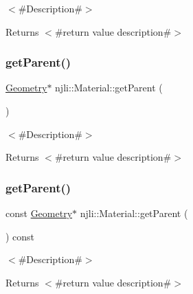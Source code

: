 $<$\#\+Description\#$>$

\begin{DoxyReturn}{Returns}
$<$\#return value description\#$>$ 
\end{DoxyReturn}
\mbox{\label{classnjli_1_1_material_a45ed0723a5bff8db95b0e6e5b6b48a3e}} 
\subsubsection{\texorpdfstring{get\+Parent()}{getParent()}\hspace{0.1cm}{\footnotesize\ttfamily [1/2]}}
{\footnotesize\ttfamily \mbox{\hyperlink{classnjli_1_1_geometry}{Geometry}}$\ast$ njli\+::\+Material\+::get\+Parent (\begin{DoxyParamCaption}{ }\end{DoxyParamCaption})}

$<$\#\+Description\#$>$

\begin{DoxyReturn}{Returns}
$<$\#return value description\#$>$ 
\end{DoxyReturn}
\mbox{\label{classnjli_1_1_material_a77b6c840f54e6a088248a46f43ac7f23}} 
\subsubsection{\texorpdfstring{get\+Parent()}{getParent()}\hspace{0.1cm}{\footnotesize\ttfamily [2/2]}}
{\footnotesize\ttfamily const \mbox{\hyperlink{classnjli_1_1_geometry}{Geometry}}$\ast$ njli\+::\+Material\+::get\+Parent (\begin{DoxyParamCaption}{ }\end{DoxyParamCaption}) const}

$<$\#\+Description\#$>$

\begin{DoxyReturn}{Returns}
$<$\#return value description\#$>$ 
\end{DoxyReturn}
\mbox{\label{classnjli_1_1_material_ac4ca71716ed832be357f15f8262c8448}} 

